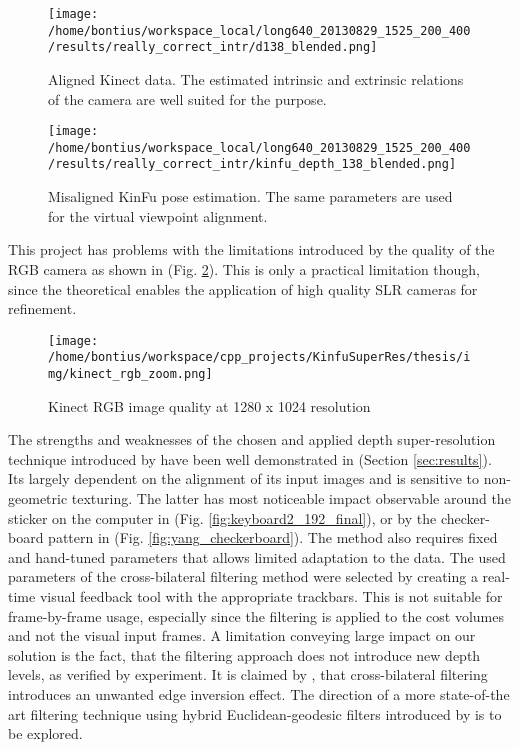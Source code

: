 \documentclass{ucl_thesis}
\newcommand{\figref}[1]{(Fig. \ref{#1})}
\newcommand{\secref}[1]{(Section \ref{#1})}
\begin{document}
\begin{figure}[h!]\centering
	\begin{minipage}[b]{0.49\linewidth}
		\texttt{[image: /home/bontius/workspace\_local/long640\_20130829\_1525\_200\_400/results/really\_correct\_intr/d138\_blended.png]}
		\caption{Aligned Kinect data. The estimated intrinsic and extrinsic relations of the camera are well suited for the purpose.}
	\end{minipage}
	\begin{minipage}[b]{0.49\linewidth}
		\texttt{[image: /home/bontius/workspace\_local/long640\_20130829\_1525\_200\_400/results/really\_correct\_intr/kinfu\_depth\_138\_blended.png]}
		\caption{Misaligned KinFu pose estimation. The same parameters are used for the virtual viewpoint alignment.}
	\end{minipage}
	\label{fig:limit_kinfu_pose}
\end{figure}

This project has problems with the limitations introduced by the quality of the RGB camera as shown in \figref{fig:kinect_rgb_zoom}. This is only a practical limitation though, since the theoretical enables the application of high quality SLR cameras for refinement.

\begin{figure}[h!]\centering
        \texttt{[image: /home/bontius/workspace/cpp\_projects/KinfuSuperRes/thesis/img/kinect\_rgb\_zoom.png]}
        \caption{Kinect RGB image quality at 1280 x 1024 resolution}
        \label{fig:kinect_rgb_zoom}
\end{figure}

\par The strengths and weaknesses of the chosen and applied depth super-resolution technique introduced by \citep{cvpr-07-qingxiong-yang} have been well demonstrated in \secref{sec:results}. Its largely dependent on the alignment of its input images and is sensitive to non-geometric texturing. The latter has most noticeable impact observable around the sticker on the computer in \figref{fig:keyboard2_192_final}, or by the checker-board pattern in  \figref{fig:yang_checkerboard}. The method also requires fixed and hand-tuned parameters that allows limited adaptation to the data. The used parameters of the cross-bilateral filtering method were selected by creating a real-time visual feedback tool with the appropriate trackbars. This is not suitable for frame-by-frame usage, especially since the filtering is applied to the cost volumes and not the visual input frames. A limitation conveying large impact on our solution is the fact, that the filtering approach does not introduce new depth levels, as verified by experiment.
It is claimed by \citep{guided_filter}, that cross-bilateral filtering introduces an unwanted edge inversion effect. The direction of a more state-of-the art filtering technique using hybrid Euclidean-geodesic filters introduced by \citep{Gastal:2012} is to be explored.
    
\end{document}
